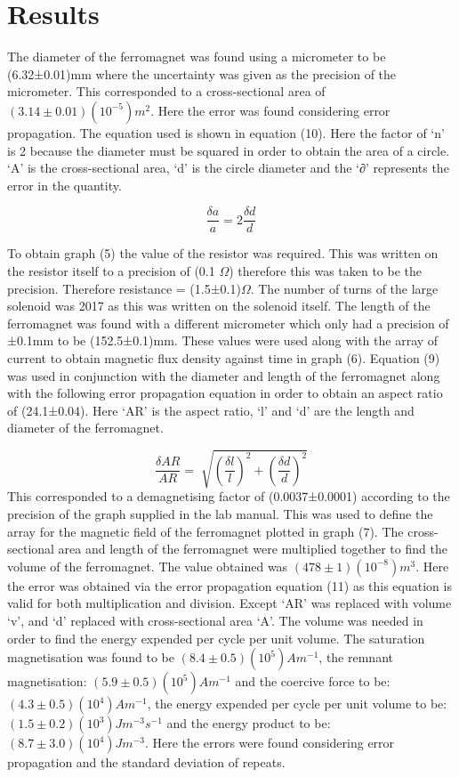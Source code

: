 \documentclass[a4paper]{article}\usepackage[english]{babel}
\begin{document}
\section{Results}
The diameter of the ferromagnet was found using a micrometer to be (6.32±0.01)mm where the uncertainty was given as the precision of the micrometer. This corresponded to a cross-sectional area of $(3.14±0.01)(10^{-5})m^2$. Here the error was found considering error propagation. The equation used is shown in equation (10). Here the factor of ‘n’ is 2 because the diameter must be squared in order to obtain the area of a circle. ‘A’ is the cross-sectional area, ‘d’ is the circle diameter and the ‘∂’ represents the error in the quantity.

\begin{equation}\label{my_tenth_equation}
\frac{\delta a}{a}=2\frac{\delta d}{d}
\end{equation}

To obtain graph (5) the value of the resistor was required. This was written on the resistor itself to a precision of (0.1 $\Omega$) therefore this was taken to be the precision. Therefore resistance = (1.5±0.1)$\Omega$. 
The number of turns of the large solenoid was 2017 as this was written on the solenoid itself. The length of the ferromagnet was found with a different micrometer which only had a precision of ±0.1mm to be (152.5±0.1)mm. These values were used along with the array of current to obtain magnetic flux density against time in graph (6). 
Equation (9) was used in conjunction with the diameter and length of the ferromagnet along with the following error propagation equation in order to obtain an aspect ratio of (24.1±0.04). Here ‘AR’ is the aspect ratio, ‘l’ and ‘d’ are the length and diameter of the ferromagnet.

\begin{equation}\label{my_eleventh_equation}
\frac{\delta AR}{AR}=\sqrt[]{(\frac{\delta l}{l})^2+(\frac{\delta d}{d})^2}
\end{equation}
This corresponded to a demagnetising factor of (0.0037±0.0001) according to the precision of the graph supplied in the lab manual. This was used to define the array for the magnetic field of the ferromagnet plotted in graph (7). 
The cross-sectional area and length of the ferromagnet were multiplied together to find the volume of the ferromagnet. The value obtained was $(478±1)(10^{-8})m^3$. Here the error was obtained via the error propagation equation (11) as this equation is valid for both multiplication and division. Except ‘AR’ was replaced with volume ‘v’, and ‘d’ replaced with cross-sectional area ‘A’. The volume was needed in order to find the energy expended per cycle per unit volume.
The saturation magnetisation was found to be $(8.4±0.5)(10^5)Am^{-1}$, the remnant magnetisation: $(5.9±0.5)(10^5)Am^{-1}$ and the coercive force to be: $(4.3±0.5)(10^4)Am^{-1}$, the energy expended per cycle per unit volume to be: $(1.5±0.2)(10^3)Jm^{-3}s^{-1}$ and the energy product to be: $(8.7±3.0)(10^4)Jm^{-3}$. Here the errors were found considering error propagation and the standard deviation of repeats.
\end{document}
